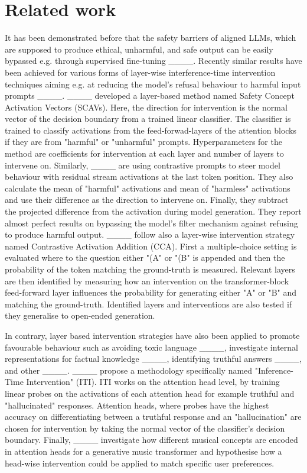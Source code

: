 \section{Related work}
It has been demonstrated before that the safety barriers of aligned LLMs, which are supposed to produce ethical, unharmful, and safe output can be easily bypassed e.g. through supervised fine-tuning ____.
Recently similar results have been achieved for various forms of layer-wise interference-time intervention techniques aiming e.g. at reducing the model's refusal behaviour to harmful input prompts ____. %
____ developed a layer-based method named Safety Concept Activation Vectors (SCAVs). Here, the direction for intervention is the normal vector of the decision boundary from a trained linear classifier. The classifier is trained to classify activations from the feed-forwad-layers of the attention blocks if they are from "harmful" or "unharmful" prompts. Hyperparameters for the method are coefficients for intervention at each layer and number of layers to intervene on. Similarly, ____ are using contrastive prompts to steer model behaviour with residual stream activations at the last token position. They also calculate the mean of "harmful" activations and mean of "harmless" activations and use their difference as the direction to intervene on. Finally, they subtract the projected difference from the activation during model generation. They report almost perfect results on bypassing the model's filter mechanism against refusing to produce harmful output.
____ follow also a layer-wise intervention strategy named Contrastive Activation Addition (CCA). First a multiple-choice setting is evaluated where to the question either "(A" or "(B" is appended and then the probability of the token matching the ground-truth is measured. Relevant layers are then identified by measuring how an intervention on the transformer-block feed-forward layer influences the probability for generating either "A" or "B" and matching the ground-truth. Identified layers and interventions are also tested if they generalise to open-ended generation. 
\par
In contrary, layer based intervention strategies have also been applied to promote favourable behaviour such as avoiding toxic language ____, investigate internal representations for factual knowledge ____, identifying truthful answers ____, and other ____.
____ propose a methodology specifically named "Inference-Time Intervention" (ITI). ITI works on the attention head level, by training linear probes on the activations of each attention head for example truthful and "hallucinated" responses. Attention heads, where probes have the highest accuracy on differentiating between a truthful response and an "hallucination" are chosen for intervention by taking the normal vector of the classifier's decision boundary. Finally, ____ investigate how different musical concepts are encoded in attention heads for a generative music transformer and hypothesise how a head-wise intervention could be applied to match specific user preferences.

